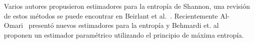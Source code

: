 \documentclass[12pt]{article}
\begin{document}
Varios autores propusieron estimadores para la entropía de Shannon, una revisión de estos métodos se puede encontrar en Beirlant et al.~\cite{Beirlant1997}. 
Recientemente Al-Omari~\cite{AlOmari2013} presentó nuevos estimadores para la entropía y Behmardi et. al~\cite{Behmardi2011} proponen un estimador paramétrico utilizando el principio de máxima entropía. 




\end{document}
